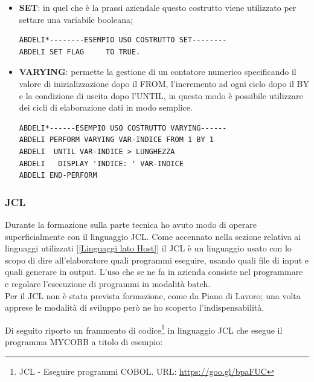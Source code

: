 \begin{itemize}
	\item \textbf{SET}: in quel che è la prassi aziendale questo costrutto viene utilizzato per settare una variabile booleana;
	\begin{lstlisting}[language=cobol, caption={Esempio d'uso costrutto SET in COBOL}]
ABDELI*--------ESEMPIO USO COSTRUTTO SET--------
ABDELI SET FLAG		TO TRUE.
	\end{lstlisting}

	\item \textbf{VARYING}: permette la gestione di un contatore numerico specificando il valore di inizializzazione dopo il FROM, l'incremento ad ogni ciclo dopo il BY e la condizione di uscita dopo l'UNTIL, in questo modo è possibile utilizzare dei cicli di elaborazione dati in modo semplice.
	\begin{lstlisting}[language=cobol, caption={Esempio d'uso costrutto VARYING in COBOL}]	
ABDELI*------ESEMPIO USO COSTRUTTO VARYING------
ABDELI PERFORM VARYING VAR-INDICE FROM 1 BY 1
ABDELI  UNTIL VAR-INDICE > LUNGHEZZA
ABDELI   DISPLAY 'INDICE: ' VAR-INDICE
ABDELI END-PERFORM
	\end{lstlisting}
		
\end{itemize}
	
\subsubsection{JCL}
Durante la formazione sulla parte tecnica ho avuto modo di operare superficialmente con il linguaggio JCL\glossario. Come accennato nella sezione relativa ai linguaggi utilizzati [\ref{Linguaggi lato Host}] il JCL è un linguaggio usato con lo scopo di dire all'elaboratore quali programmi eseguire, usando quali file di input e quali generare in output. L'uso che se ne fa in azienda consiste nel programmare e regolare l’esecuzione di programmi in modalità batch\glossario. \\

Per il JCL non è stata prevista formazione, come da Piano di Lavoro; una volta apprese le modalità di sviluppo però ne ho scoperto l'indispensabilità.\\

\newpage

Di seguito riporto un frammento di codice\footnote{JCL - Eseguire programmi COBOL. URL: \url{https://goo.gl/bpaFUC}} in linguaggio JCL che esegue il programma MYCOBB a titolo di esempio:

